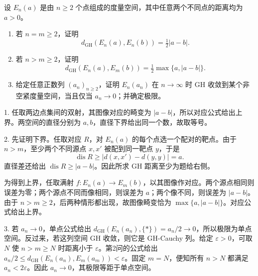 \begin{exercise}\label{g3:ex:gh-equilateral-spaces}
	设 \(E_n(a)\) 是由 \(n\ge2\) 个点组成的度量空间，其中任意两个不同点的距离均为 \(a>0\)。
	\begin{enumerate}
		\item 若 \(n=m\ge2\)，证明
		\[
			d_{\mathrm{GH}}(E_n(a),E_n(b))=\tfrac12|a-b|.
		\]
		\item 若 \(n>m\ge2\)，证明
		\[
			d_{\mathrm{GH}}(E_n(a),E_m(b))
			=\tfrac12\max\{a,|a-b|\}.
		\]
		\item 给定任意正数列 \((a_n)_{n\ge2}\)，证明 \(E_n(a_n)\) 在 \(n\to\infty\) 时 GH 收敛到某个非空紧度量空间，当且仅当 \(a_n\to0\)；并确定极限。
	\end{enumerate}
\end{exercise}
\begin{solution}
	1. 任取两边点集间的双射，其图像对应的畸变为 \(|a-b|\)，所以对应公式给出上界。两空间的直径分别为 \(a,b\)，直径下界给出同一个数，故取等号。

	2. 先证明下界。任取对应 \(R\)，对 \(E_n(a)\) 的每个点选一个配对的靶点。由于 \(n>m\)，至少两个不同源点 \(x,x'\) 被配到同一靶点 \(y\)，于是
	\[
		\operatorname{dis}R\ge|d(x,x')-d(y,y)|=a.
	\]
	直径差还给出 \(\operatorname{dis}R\ge|a-b|\)。因此所求 GH 距离至少为题给右侧。

	为得到上界，任取满射 \(f:E_n(a)\to E_m(b)\)，以其图像作对应。两个源点相同则误差为零；两个源点不同而像相同，则误差为 \(a\)；两个像不同，则误差为 \(|a-b|\)。由于 \(n>m\ge2\)，后两种情形都出现，故图像畸变恰为 \(\max\{a,|a-b|\}\)。对应公式给出上界。

	3. 若 \(a_n\to0\)，单点公式给出 \(d_{\mathrm{GH}}(E_n(a_n),\{*\})=a_n/2\to0\)，所以极限为单点空间。反过来，若这列空间 GH 收敛，则它是 GH-Cauchy 列。给定 \(\varepsilon>0\)，可取 \(N\) 使 \(n>m\ge N\) 时距离小于 \(\varepsilon\)。第2问的公式给出 \(a_n/2\le d_{\mathrm{GH}}(E_n(a_n),E_m(a_m))<\varepsilon\)。固定 \(m=N\)，便知所有 \(n>N\) 都满足 \(a_n<2\varepsilon\)。因此 \(a_n\to0\)，其极限等距于单点空间。
\end{solution}

